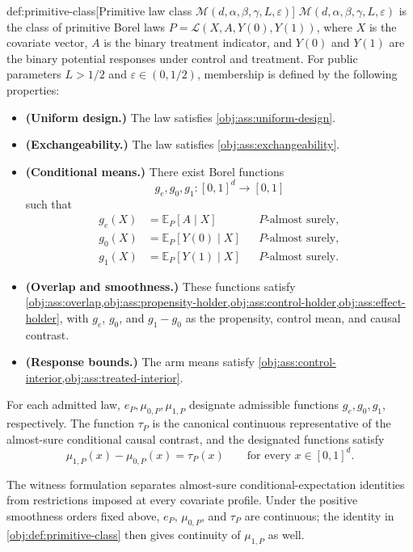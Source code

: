 \documentclass[11pt]{article}
\begin{document}
\begin{definitionv}{def:primitive-class}[Primitive law class \(\mathcal M(d,\alpha,\beta,\gamma,L,\varepsilon)\)]
\(\mathcal M(d,\alpha,\beta,\gamma,L,\varepsilon)\) is the class of primitive Borel laws \(P=\mathcal L(X,A,Y(0),Y(1))\), where \(X\) is the covariate vector, \(A\) is the binary treatment indicator, and \(Y(0)\) and \(Y(1)\) are the binary potential responses under control and treatment. For public parameters \(L>1/2\) and \(\varepsilon\in(0,1/2)\), membership is defined by the following properties:
\begin{itemize}
\item \textbf{(Uniform design.)} The law satisfies \cref{obj:ass:uniform-design}.
\item \textbf{(Exchangeability.)} The law satisfies \cref{obj:ass:exchangeability}.
\item \textbf{(Conditional means.)} There exist Borel functions
\[
g_e,g_0,g_1:[0,1]^d\to[0,1]
\]
such that
\[
\begin{aligned}
g_e(X)&=\mathbb E_P[A\mid X] &&P\text{-almost surely},\\
g_0(X)&=\mathbb E_P[Y(0)\mid X] &&P\text{-almost surely},\\
g_1(X)&=\mathbb E_P[Y(1)\mid X] &&P\text{-almost surely}.
\end{aligned}
\]
\item \textbf{(Overlap and smoothness.)} These functions satisfy \cref{obj:ass:overlap,obj:ass:propensity-holder,obj:ass:control-holder,obj:ass:effect-holder}, with \(g_e\), \(g_0\), and \(g_1-g_0\) as the propensity, control mean, and causal contrast.
\item \textbf{(Response bounds.)} The arm means satisfy \cref{obj:ass:control-interior,obj:ass:treated-interior}.
\end{itemize}
For each admitted law, \(e_P,\mu_{0,P},\mu_{1,P}\) designate admissible functions \(g_e,g_0,g_1\), respectively. The function \(\tau_P\) is the canonical continuous representative of the almost-sure conditional causal contrast, and the designated functions satisfy
\[
\mu_{1,P}(x)-\mu_{0,P}(x)=\tau_P(x)
\qquad\text{for every }x\in[0,1]^d.
\]
\end{definitionv}

The witness formulation separates almost-sure conditional-expectation identities from restrictions imposed at every covariate profile. Under the positive smoothness orders fixed above, \(e_P\), \(\mu_{0,P}\), and \(\tau_P\) are continuous; the identity in \cref{obj:def:primitive-class} then gives continuity of \(\mu_{1,P}\) as well.
\end{document}
